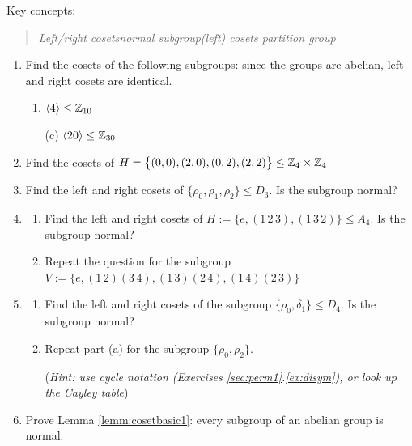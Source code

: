 \begin{exercises}{}{}
	Key concepts:
	\begin{quote}
		\emph{Left/right cosets\qquad normal subgroup\qquad (left) cosets partition group}
	\end{quote}

	\begin{enumerate}
	  \item Find the cosets of the following subgroups: since the groups are abelian, left and right cosets are identical.
		\begin{enumerate}
	  	\item {} $\left\langle 4\right\rangle\le\mathbb{Z}_{10}$
		  \item[(c)]  $\left\langle 20\right\rangle\le\mathbb{Z}_{30}$
		\end{enumerate}
			
			
		\item\label{exs:VfactorV} Find the cosets of $H=\bigl\{(0,0),(2,0),(0,2),(2,2)\bigr\}\le\mathbb{Z}_4\times\mathbb{Z}_4$
			
			
		\item Find the left and right cosets of $\{\rho_0,\rho_1,\rho_2\}\le D_3$. Is the subgroup normal?
		
		
		\item\label{exs:va4}\begin{enumerate}
		  \item Find the left and right cosets of $H:=\{e,(1\,2\,3),(1\,3\,2)\}\le A_4$. Is the subgroup normal?
		  \item Repeat the question for the subgroup $V:=\{e,(1\,2)(3\,4),(1\,3)(2\,4),(1\,4)(2\,3)\}$
		\end{enumerate}
		
	
		\item\label{exs:d4normal}\begin{enumerate}
		  \item Find the left and right cosets of the subgroup $\{\rho_0,\delta_1\}\le D_4$. Is the subgroup normal?
			\item Repeat part (a) for the subgroup $\{\rho_0,\rho_2\}$.
			\par
			(\emph{Hint: use cycle notation (Exercises \ref*{sec:perm1}.\ref{ex:disym}), or look up the Cayley table})
		\end{enumerate}
	  
	  
	  \item Prove Lemma \ref{lemm:cosetbasic1}: every subgroup of an abelian group is normal.
	  

\end{enumerate}
\end{exercises}
